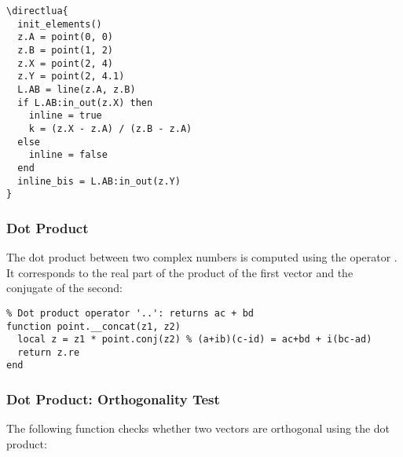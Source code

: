 \begin{minipage}{.5\textwidth}
\begin{verbatim}
\directlua{
  init_elements()
  z.A = point(0, 0)
  z.B = point(1, 2)
  z.X = point(2, 4)
  z.Y = point(2, 4.1)
  L.AB = line(z.A, z.B)
  if L.AB:in_out(z.X) then
    inline = true
    k = (z.X - z.A) / (z.B - z.A)
  else
    inline = false
  end
  inline_bis = L.AB:in_out(z.Y)
}
\end{verbatim}
\end{minipage}
\begin{minipage}{.5\textwidth}
\begin{center}
\end{center}
\end{minipage}


\subsubsection{Dot Product} %
\label{ssub:scalar_product}

The dot product between two complex numbers is computed using the operator . It corresponds to the real part of the product of the first vector and the conjugate of the second:

\begin{verbatim}
% Dot product operator '..': returns ac + bd
function point.__concat(z1, z2)
  local z = z1 * point.conj(z2) % (a+ib)(c-id) = ac+bd + i(bc-ad)
  return z.re
end
\end{verbatim}


\subsubsection{Dot Product: Orthogonality Test} %
\label{ssub:scalar_product_orthogonality_test}

The following function  checks whether two vectors are orthogonal using the dot product:

